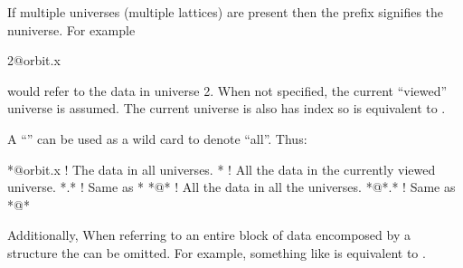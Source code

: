 If multiple universes (multiple lattices) are present then the prefix
 signifies the n\Th universe. For example
\begin{example}
  2@orbit.x
\end{example}
would refer to the  data in universe 2. When not
specified, the current ``viewed'' universe is assumed. The current
 universe is also has index  so  is
equivalent to .

A ``\vn{*}'' can be used as a wild card to denote ``all''. Thus:
\begin{example}
  *@orbit.x   ! The  data in all universes.
  *           ! All the data in the currently viewed universe.
  *.*         ! Same as *
  *@*         ! All the data in all the universes. 
  *@*.*       ! Same as *@*
\end{example}
Additionally, When referring to an entire block of data encomposed by
a  structure the \vn{[*]} can be omitted. For example,
something like  is equivalent to
.

